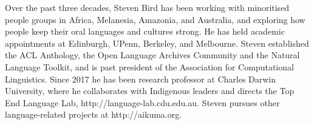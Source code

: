 Over the past three decades, Steven Bird has been working with minoritised people groups in Africa, Melanesia, Amazonia, and Australia, and exploring how people keep their oral languages and cultures strong. He has held academic appointments at Edinburgh, UPenn, Berkeley, and Melbourne. Steven established the ACL Anthology, the Open Language Archives Community and the Natural Language Toolkit, and is past president of the Association for Computational Linguistics. Since 2017 he has been research professor at Charles Darwin University, where he collaborates with Indigenous leaders and directs the Top End Language Lab, http://language-lab.cdu.edu.au. Steven pursues other language-related projects at http://aikuma.org.